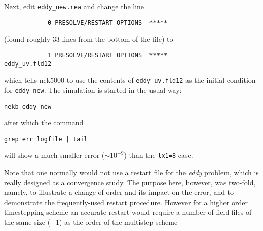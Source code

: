 Next, edit {\tt eddy\_new.rea} and change the line 
\begin{verbatim}
            0 PRESOLVE/RESTART OPTIONS  *****
\end{verbatim}
(found roughly 33 lines from the bottom of the file) to
\begin{verbatim}
            1 PRESOLVE/RESTART OPTIONS  *****
eddy_uv.fld12
\end{verbatim}
which tells nek5000 to use the contents of {\tt eddy\_uv.fld12}
as the initial condition for {\tt eddy\_new}.
The simulation is started in the usual way:
\begin{verbatim}
nekb eddy_new
\end{verbatim}
after which the command
\begin{verbatim}
grep err logfile | tail
\end{verbatim}
will show a much smaller error ($\sim 10^{-9}$) than the {\tt lx1=8}
case. 

Note that one normally would not use a restart file for the {\em eddy}
problem, which is really designed as a convergence study.  The purpose here, however, was two-fold, namely,
to illustrate a change of order and its impact on the error, and to
demonstrate the frequently-used restart procedure. However for a higher order timestepping scheme an accurate restart would require a number of field files of the same size (+1) as the order of the multistep scheme
